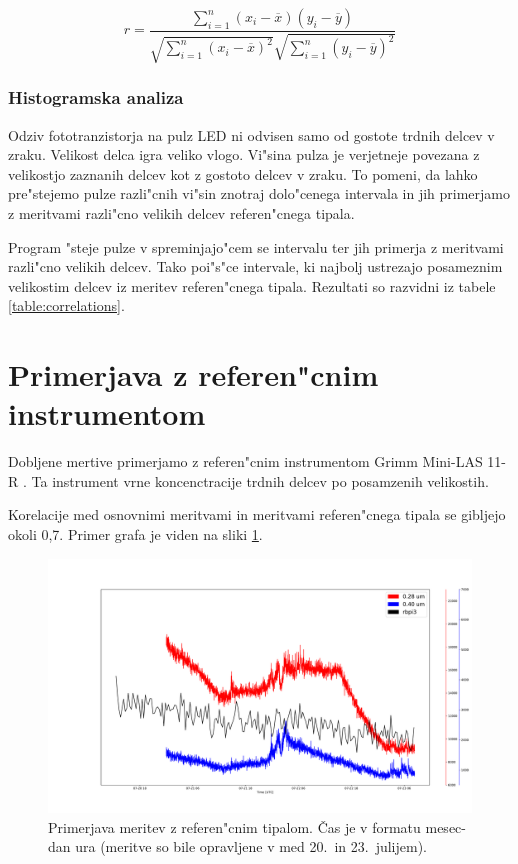 \documentclass[12pt,a4paper]{article}
\begin{document}
$$
r = \frac{\sum_{i=1}^{n} (x_i - \overline{x}) (y_i - \overline{y})}{\sqrt{\sum_{i=1}^{n} (x_i - \overline{x})^2} \sqrt{\sum_{i=1}^{n} (y_i - \overline{y})^2}}
$$


\subsubsection{Histogramska analiza}
Odziv fototranzistorja na pulz LED ni odvisen samo od gostote trdnih delcev v zraku. Velikost delca igra veliko vlogo. Vi"sina pulza je verjetneje povezana z velikostjo zaznanih delcev kot z gostoto delcev v zraku. To pomeni, da lahko pre"stejemo pulze razli"cnih vi"sin znotraj dolo"cenega intervala in jih primerjamo z meritvami razli"cno velikih delcev referen"cnega tipala.

Program "steje pulze v spreminjajo"cem se intervalu ter jih primerja z meritvami razli"cno velikih delcev. Tako poi"s"ce intervale, ki najbolj ustrezajo posameznim velikostim delcev iz meritev referen"cnega tipala. Rezultati so razvidni iz tabele \ref{table:correlations}.

\clearpage
\section{Primerjava z referen"cnim instrumentom}
Dobljene mertive primerjamo z referen"cnim instrumentom Grimm Mini-LAS 11-R \cite{grimm-min-las}. Ta instrument vrne koncenctracije trdnih delcev po posamzenih velikostih.

Korelacije med osnovnimi meritvami in meritvami referen"cnega tipala se gibljejo okoli 0,7. Primer grafa je viden na sliki \ref{comparison}.

\begin{figure}[H]
	\begin{center}
		\includegraphics[width=16cm]{comparison.pdf}
		\caption{Primerjava meritev z referen"cnim tipalom. Čas je v formatu mesec-dan ura (meritve so bile opravljene v med 20.~in 23.~julijem). }
		\label{comparison}
	\end{center}
\end{figure}
\end{document}
